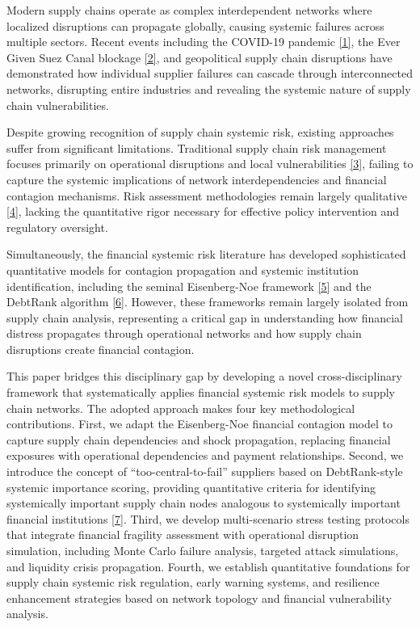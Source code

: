 \documentclass[a4 paper, 11pt,twoside]{article}
\newcommand{\0}{\Bf{0}}
\theoremstyle{definition}
\begin{document}
Modern supply chains operate as complex interdependent networks where localized disruptions can propagate globally, causing systemic failures across multiple sectors. Recent events including the COVID-19 pandemic \hyperref[ref1]{[1]}, the Ever Given Suez Canal blockage \hyperref[ref2]{[2]}, and geopolitical supply chain disruptions have demonstrated how individual supplier failures can cascade through interconnected networks, disrupting entire industries and revealing the systemic nature of supply chain vulnerabilities.

Despite growing recognition of supply chain systemic risk, existing approaches suffer from significant limitations. Traditional supply chain risk management focuses primarily on operational disruptions and local vulnerabilities \hyperref[ref3]{[3]}, failing to capture the systemic implications of network interdependencies and financial contagion mechanisms. Risk assessment methodologies remain largely qualitative \hyperref[ref4]{[4]}, lacking the quantitative rigor necessary for effective policy intervention and regulatory oversight.

Simultaneously, the financial systemic risk literature has developed sophisticated quantitative models for contagion propagation and systemic institution identification, including the seminal Eisenberg-Noe framework \hyperref[ref5]{[5]} and the DebtRank algorithm \hyperref[ref6]{[6]}. However, these frameworks remain largely isolated from supply chain analysis, representing a critical gap in understanding how financial distress propagates through operational networks and how supply chain disruptions create financial contagion.

This paper bridges this disciplinary gap by developing a novel cross-disciplinary framework that systematically applies financial systemic risk models to supply chain networks. The adopted approach makes four key methodological contributions. First, we adapt the Eisenberg-Noe financial contagion model to capture supply chain dependencies and shock propagation, replacing financial exposures with operational dependencies and payment relationships. Second, we introduce the concept of ``too-central-to-fail'' suppliers based on DebtRank-style systemic importance scoring, providing quantitative criteria for identifying systemically important supply chain nodes analogous to systemically important financial institutions \hyperref[ref7]{[7]}. Third, we develop multi-scenario stress testing protocols that integrate financial fragility assessment with operational disruption simulation, including Monte Carlo failure analysis, targeted attack simulations, and liquidity crisis propagation. Fourth, we establish quantitative foundations for supply chain systemic risk regulation, early warning systems, and resilience enhancement strategies based on network topology and financial vulnerability analysis.
\end{document}
